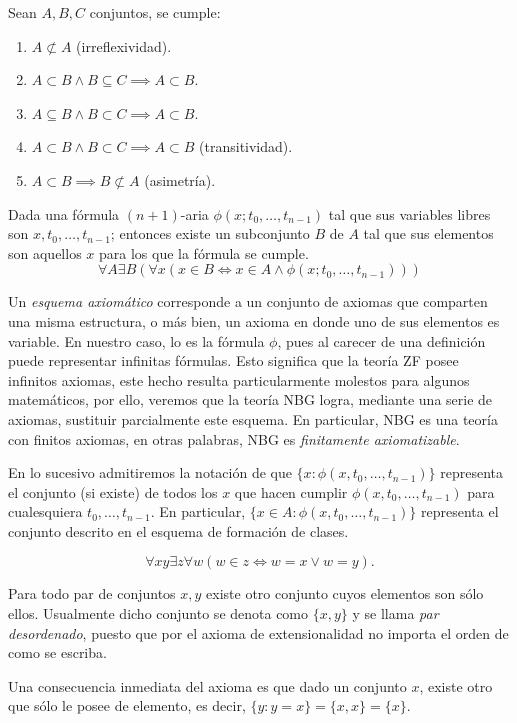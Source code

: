 \documentclass[11pt,a4paper]{book}
\begin{document}
\begin{prop}
	Sean $A,B,C$ conjuntos, se cumple:
	\begin{enumerate}
		\item $A\not\subset A$ (irreflexividad).
		\item $A\subset B\wedge B\subseteq C\implies A\subset B$.
		\item $A\subseteq B\wedge B\subset C\implies A\subset B$.
		\item $A\subset B\wedge B\subset C\implies A\subset B$ (transitividad).
		\item $A\subset B\implies B\not\subset A$ (asimetría).
	\end{enumerate}
\end{prop}
\begin{axiom}
	Dada una fórmula $(n+1)$-aria $\phi(x;t_0,\dots,t_{n-1})$ tal que sus variables libres son $x,t_0,\dots,t_{n-1}$; entonces existe un subconjunto $B$ de $A$ tal que sus elementos son aquellos $x$ para los que la fórmula se cumple.
	$$\forall A\exists B(\forall x(x\in B\iff x\in A\wedge\phi(x;t_0,\dots,t_{n-1})))$$
\end{axiom}
Un \textit{esquema axiomático} corresponde a un conjunto de axiomas que comparten una misma estructura, o más bien, un axioma en donde uno de sus elementos es variable. En nuestro caso, lo es la fórmula $\phi$, pues al carecer de una definición puede representar infinitas fórmulas. Esto significa que la teoría ZF posee infinitos axiomas, este hecho resulta particularmente molestos para algunos matemáticos, por ello, veremos que la teoría NBG logra, mediante una serie de axiomas, sustituir parcialmente este esquema. En particular, NBG es una teoría con finitos axiomas, en otras palabras, NBG es \textit{finitamente axiomatizable}.

En lo sucesivo admitiremos la notación de que $\{x:\phi(x,t_0,\dots,t_{n-1})\}$ representa el conjunto (si existe) de todos los $x$ que hacen cumplir $\phi(x,t_0,\dots,t_{n-1})$ para cualesquiera $t_0,\dots,t_{n-1}$. En particular, $\{x\in A:\phi(x,t_0,\dots,t_{n-1})\}$ representa el conjunto descrito en el esquema de formación de clases.
\begin{axiom}
	$$\forall xy\exists z\forall w(w\in z\iff w=x\vee w=y).$$

	Para todo par de conjuntos $x,y$ existe otro conjunto cuyos elementos son sólo ellos. Usualmente dicho conjunto se denota como $\{x,y\}$ y se llama \textit{par desordenado}, puesto que por el axioma de extensionalidad no importa el orden de como se escriba.
\end{axiom}
Una consecuencia inmediata del axioma es que dado un conjunto $x$, existe otro que sólo le posee de elemento, es decir, $\{y:y=x\}=\{x,x\}=\{x\}$.
\end{document}
